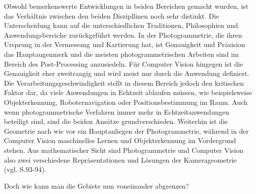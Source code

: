 Obwohl bemerkenswerte Entwicklungen in beiden Bereichen gemacht wurden, ist das Verhältnis zwischen den beiden Diszipllinen noch sehr distinkt. Die Unterscheidung kann auf die unterschiedlichen Traditionen, Philosophien und Anwendungsbereiche zurückgeführt werden. In der Photogrammetrie, die ihren Ursprung in der Vermessung und Kartierung hat, ist Genauigkeit und Präzision das Hauptaugenmerk und die meisten photogrammetrischen Arbeiten sind im Bereich des Post-Processing anzusiedeln. Für Computer Vision hingegen ist die Genauigkeit eher zweitrangig und wird meist nur durch die Anwendung definiert. Die Verarbeitungsgeschwindigkeit stellt in diesem Bereich jedoch den kritischen Faktor dar, da viele Anwendungen in Echtzeit ablaufen müssen, wie beispielsweise Objekterkennung, Roboternavigation oder Positionsbestimmung im Raum. Auch wenn photogrammetrische Verfahren immer mehr in Echtzeitanwendungen beteiligt sind, sind die beiden Ansätze grundverschieden. Weiterhin ist die Geometrie nach wie vor ein Hauptanliegen der Photogrammetrie, während in der Computer Vision maschinelles Lernen und Objekterkennung im Vordergrund stehen. Aus mathematischer Sicht sind Photogrammetrie und Computer Vision also zwei verschiedene Repräsentationen und Lösungen der Kamerageometrie (vgl. \cite{ph_vs_cv} S.93-94).

Doch wie kann man die Gebiete nun voneinander abgrenzen? 

